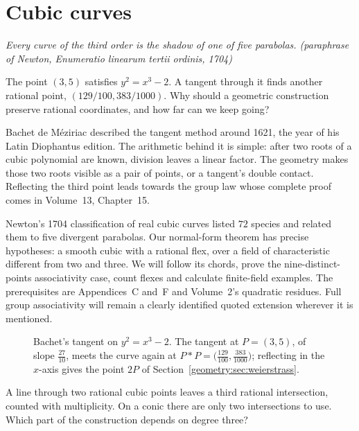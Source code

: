 \chapter{Cubic curves}\label{geometry:ch:cubics}

\begin{center}\itshape
Every curve of the third order is the shadow of one of five parabolas.
\upshape(paraphrase of Newton, \emph{Enumeratio linearum tertii ordinis}, 1704)
\end{center}

The point $(3,5)$ satisfies $y^2=x^3-2$. A tangent through it finds another rational point, $(129/100,383/1000)$. Why should a geometric construction preserve rational coordinates, and how far can we keep going?

Bachet de M\'eziriac described the tangent method around 1621, the year of his Latin Diophantus edition. The arithmetic behind it is simple: after two roots of a cubic polynomial are known, division leaves a linear factor. The geometry makes those two roots visible as a pair of points, or a tangent's double contact. Reflecting the third point leads towards the group law whose complete proof comes in Volume~13, Chapter~15.

Newton's 1704 classification of real cubic curves listed $72$ species and related them to five divergent parabolas. Our normal-form theorem has precise hypotheses: a smooth cubic with a rational flex, over a field of characteristic different from two and three. We will follow its chords, prove the nine-distinct-points associativity case, count flexes and calculate finite-field examples. The prerequisites are Appendices~C and~F and Volume~2's quadratic residues. Full group associativity will remain a clearly identified quoted extension wherever it is mentioned.

\begin{figure}[ht]
\centering
{}
\caption{Bachet's tangent on $y^2=x^3-2$. The tangent at $P=(3,5)$, of slope $\frac{27}{10}$, meets the curve again at
$P*P=\bigl(\frac{129}{100},\frac{383}{1000}\bigr)$; reflecting in the $x$-axis gives the point $2P$ of Section~\ref{geometry:sec:weierstrass}.}
\label{geometry:fig:bachet}
\end{figure}

\begin{think}
A line through two rational cubic points leaves a third rational intersection, counted with multiplicity. On a conic there are only two intersections to use. Which part of the construction depends on degree three?
\end{think}

